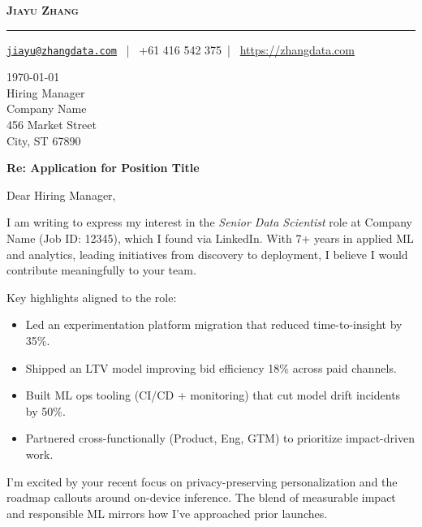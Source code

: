 \documentclass[11pt]{letter}
\date{}
\makeatletter
\providecommand{\SenderName}{Your Name}
\providecommand{\SenderPhone}{}
\providecommand{\SenderEmail}{}
\providecommand{\SenderWebsite}{}
\renewcommand{\SenderName}{Jiayu Zhang}
\renewcommand{\SenderPhone}{+61 416 542 375}
\renewcommand{\SenderEmail}{jiayu@zhangdata.com}
\renewcommand{\SenderWebsite}{https://zhangdata.com}
\newcommand{\RecipientName}{Hiring Manager}
\newcommand{\CompanyName}{Company Name}
\newcommand{\CompanyAddress}{456 Market Street\\City, ST 67890}
\newcommand{\LetterSubject}{Application for Position Title}
\newcommand{\MakeLetterHeader}{%
  {\Large\bfseries\scshape \SenderName}\par
  \vspace{0.4em}\hrule\vspace{0.1em}
  {\small \href{mailto:\SenderEmail}{\nolinkurl{\SenderEmail}} ~|~ \SenderPhone ~|~ \url{\SenderWebsite}}\par
  \vspace{0.9em}
}
\makeatother
\begin{document}
\begin{letter}{}

\MakeLetterHeader

{\small \today}\\[0.75em]
{\RecipientName}\\
{\CompanyName}\\
{\CompanyAddress}

\vspace{1em}

{%
  \setlength{\parskip}{0pt}%
  \textbf{Re: \LetterSubject}\par
  \opening{Dear \RecipientName,}
}

I am writing to express my interest in the \textit{Senior Data Scientist} role at
\CompanyName{} (Job ID: 12345), which I found via LinkedIn. With 7+ years in applied
ML and analytics, leading initiatives from discovery to deployment, I believe I would
contribute meaningfully to your team.

Key highlights aligned to the role:
\begin{itemize}
  \item Led an experimentation platform migration that reduced time-to-insight by 35\%.
  \item Shipped an LTV model improving bid efficiency 18\% across paid channels.
  \item Built ML ops tooling (CI/CD + monitoring) that cut model drift incidents by 50\%.
  \item Partnered cross-functionally (Product, Eng, GTM) to prioritize impact-driven work.
\end{itemize}

I’m excited by your recent focus on privacy-preserving personalization and the roadmap
callouts around on-device inference. The blend of measurable impact and responsible ML
mirrors how I’ve approached prior launches.


\end{letter}
\end{document}
